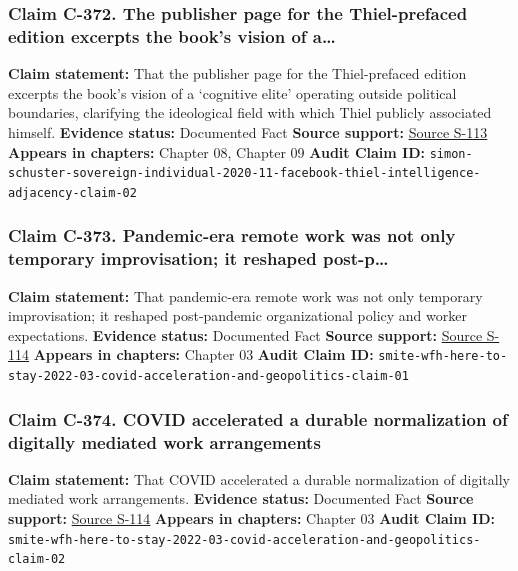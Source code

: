 \documentclass[
  american,
  11pt,
  letterpaper,
]{article}
\begin{document}
\subsubsection{Claim C-372. The publisher page for the Thiel-prefaced
edition excerpts the book's vision of
a\ldots{}}\label{claim-c-372-the-publisher-page-for-the-thiel-prefaced-edition-excerpts-the-book-s-vision-of-a}

\textbf{Claim statement:} That the publisher page for the Thiel-prefaced
edition excerpts the book's vision of a `cognitive elite' operating
outside political boundaries, clarifying the ideological field with
which Thiel publicly associated himself. \textbf{Evidence status:}
Documented Fact \textbf{Source support:}
\hyperref[source-s-113-the-sovereign-individual-official-publisher-page]{Source
S-113} \textbf{Appears in chapters:} Chapter 08, Chapter 09
\textbf{Audit Claim ID:}
\texttt{simon-schuster-sovereign-individual-2020-11-facebook-thiel-intelligence-adjacency-claim-02}

\subsubsection{Claim C-373. Pandemic-era remote work was not only
temporary improvisation; it reshaped
post-p\ldots{}}\label{claim-c-373-pandemic-era-remote-work-was-not-only-temporary-improvisation-it-reshaped-post-p}

\textbf{Claim statement:} That pandemic-era remote work was not only
temporary improvisation; it reshaped post-pandemic organizational policy
and worker expectations. \textbf{Evidence status:} Documented Fact
\textbf{Source support:}
\hyperref[source-s-114-work-from-home-is-here-to-stay-call-for-flexibility-in-post-pandemic-work-policies]{Source
S-114} \textbf{Appears in chapters:} Chapter 03 \textbf{Audit Claim ID:}
\texttt{smite-wfh-here-to-stay-2022-03-covid-acceleration-and-geopolitics-claim-01}

\subsubsection{Claim C-374. COVID accelerated a durable normalization of
digitally mediated work
arrangements}\label{claim-c-374-covid-accelerated-a-durable-normalization-of-digitally-mediated-work-arrangements}

\textbf{Claim statement:} That COVID accelerated a durable normalization
of digitally mediated work arrangements. \textbf{Evidence status:}
Documented Fact \textbf{Source support:}
\hyperref[source-s-114-work-from-home-is-here-to-stay-call-for-flexibility-in-post-pandemic-work-policies]{Source
S-114} \textbf{Appears in chapters:} Chapter 03 \textbf{Audit Claim ID:}
\texttt{smite-wfh-here-to-stay-2022-03-covid-acceleration-and-geopolitics-claim-02}
\end{document}
